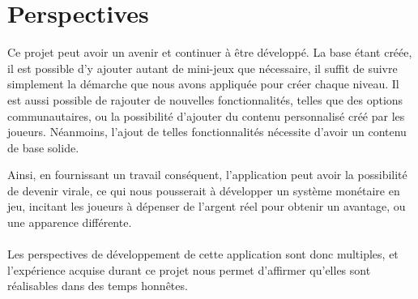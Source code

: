\section{Perspectives}
Ce projet peut avoir un avenir et continuer à être développé. La base étant créée, il est possible d'y ajouter autant de mini-jeux que nécessaire, il suffit de suivre simplement la démarche que nous avons appliquée pour créer chaque niveau. Il est aussi possible de rajouter de nouvelles fonctionnalités, telles que des options communautaires, ou la possibilité d'ajouter du contenu personnalisé créé par les joueurs. Néanmoins, l'ajout de telles fonctionnalités nécessite d'avoir un contenu de base solide.

Ainsi, en fournissant un travail conséquent, l'application peut avoir la possibilité  de devenir virale, ce qui nous pousserait à développer un système monétaire en jeu, incitant les joueurs à dépenser de l'argent réel pour obtenir un avantage, ou une apparence différente.

\paragraph{}
Les perspectives de développement de cette application sont donc multiples, et l'expérience acquise durant ce projet nous permet d'affirmer qu’elles sont réalisables dans des temps honnêtes.

